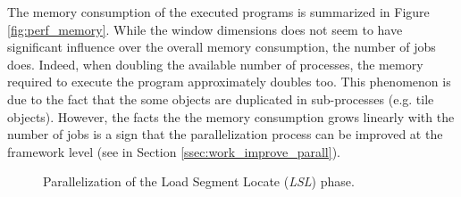The memory consumption of the executed programs is summarized in Figure \ref{fig:perf_memory}. While the window dimensions does not seem to have significant influence over the overall memory consumption, the number of jobs does. Indeed, when doubling the available number of processes, the memory required to execute the program approximately doubles too. This phenomenon is due to the fact that the some objects are duplicated in sub-processes (e.g. tile objects). However, the facts the the memory consumption grows linearly with the number of jobs is a sign that the parallelization process can be improved at the framework level (see in Section \ref{ssec:work_improve_parall}). 

\begin{figure}
	\center
	\caption{Parallelization of the Load Segment Locate (\textit{LSL}) phase.}
	\label{fig:perf_parallel_lsl}
\end{figure}

